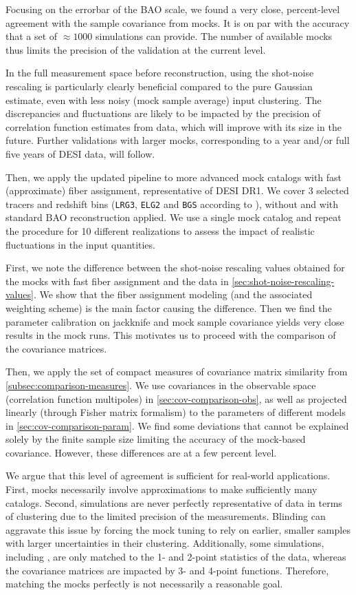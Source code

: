 Focusing on the errorbar of the BAO scale, we found a very close, percent-level agreement with the sample covariance from mocks.
It is on par with the accuracy that a set of $\approx 1000$ simulations can provide.
The number of available mocks thus limits the precision of the validation at the current level.

In the full measurement space before reconstruction, using the shot-noise rescaling is particularly clearly beneficial compared to the pure Gaussian estimate, even with less noisy (mock sample average) input clustering.
The discrepancies and fluctuations are likely to be impacted by the precision of correlation function estimates from data, which will improve with its size in the future.
Further validations with larger mocks, corresponding to a year and/or full five years of DESI data, will follow.

Then, we apply the updated pipeline to more advanced mock catalogs with fast (approximate) fiber assignment, representative of DESI DR1.
We cover 3 selected tracers and redshift bins ({\tt LRG3}, {\tt ELG2} and {\tt BGS} according to \cite{DESI2024.III.KP4}), without and with standard BAO reconstruction applied.
We use a single mock catalog and repeat the procedure for 10 different realizations to assess the impact of realistic fluctuations in the input quantities.

First, we note the difference between the shot-noise rescaling values obtained for the mocks with fast fiber assignment and the data in \cref{sec:shot-noise-rescaling-values}.
We show that the fiber assignment modeling (and the associated weighting scheme) is the main factor causing the difference.
Then we find the parameter calibration on jackknife and mock sample covariance yields very close results in the mock runs.
This motivates us to proceed with the comparison of the covariance matrices.

Then, we apply the set of compact measures of covariance matrix similarity from \cref{subsec:comparison-measures}.
We use covariances in the observable space (correlation function multipoles) in \cref{sec:cov-comparison-obs}, as well as projected linearly (through Fisher matrix formalism) to the parameters of different models in \cref{sec:cov-comparison-param}.
We find some deviations that cannot be explained solely by the finite sample size limiting the accuracy of the mock-based covariance.
However, these differences are at a few percent level.

We argue that this level of agreement is sufficient for real-world applications.
First, mocks necessarily involve approximations to make sufficiently many catalogs.
Second, simulations are never perfectly representative of data in terms of clustering due to the limited precision of the measurements.
Blinding can aggravate this issue by forcing the mock tuning to rely on earlier, smaller samples with larger uncertainties in their clustering.
Additionally, some simulations, including \ezmocks{} \citep{DESI2024.III.KP4,KP3s8-Zhao}, are only matched to the 1- and 2-point statistics of the data, whereas the covariance matrices are impacted by 3- and 4-point functions.
Therefore, matching the mocks perfectly is not necessarily a reasonable goal.

